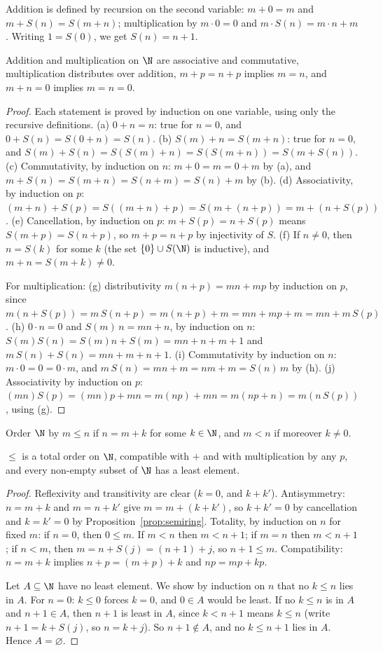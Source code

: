 Addition is defined by recursion on the second variable: $m+0=m$ and $m+S(n)=S(m+n)$; multiplication by $m\cdot0=0$ and
$m\cdot S(n)=m\cdot n+m$. Writing $1=S(0)$, we get $S(n)=n+1$.

\begin{proposition}\label{prop:semiring}
Addition and multiplication on $\N$ are associative and commutative, multiplication distributes over addition,
$m+p=n+p$ implies $m=n$, and $m+n=0$ implies $m=n=0$.
\end{proposition}
\begin{proof}
Each statement is proved by induction on one variable, using only the recursive definitions.
(a) $0+n=n$: true for $n=0$, and $0+S(n)=S(0+n)=S(n)$. (b) $S(m)+n=S(m+n)$: true for $n=0$, and
$S(m)+S(n)=S(S(m)+n)=S(S(m+n))=S(m+S(n))$. (c) Commutativity, by induction on $n$: $m+0=m=0+m$ by (a), and
$m+S(n)=S(m+n)=S(n+m)=S(n)+m$ by (b). (d) Associativity, by induction on $p$: $(m+n)+S(p)=S((m+n)+p)=S(m+(n+p))=m+(n+S(p))$.
(e) Cancellation, by induction on $p$: $m+S(p)=n+S(p)$ means $S(m+p)=S(n+p)$, so $m+p=n+p$ by injectivity of $S$.
(f) If $n\ne0$, then $n=S(k)$ for some $k$ (the set $\{0\}\cup S(\N)$ is inductive), and $m+n=S(m+k)\ne0$.

For multiplication: (g) distributivity $m(n+p)=mn+mp$ by induction on $p$, since $m(n+S(p))=m\,S(n+p)=m(n+p)+m=mn+mp+m=mn+m\,S(p)$.
(h) $0\cdot n=0$ and $S(m)\,n=mn+n$, by induction on $n$: $S(m)S(n)=S(m)n+S(m)=mn+n+m+1$ and $m\,S(n)+S(n)=mn+m+n+1$.
(i) Commutativity by induction on $n$: $m\cdot0=0=0\cdot m$, and $m\,S(n)=mn+m=nm+m=S(n)\,m$ by (h). (j) Associativity by
induction on $p$: $(mn)S(p)=(mn)p+mn=m(np)+mn=m(np+n)=m(n\,S(p))$, using (g).
\end{proof}

Order $\N$ by $m\le n$ if $n=m+k$ for some $k\in\N$, and $m<n$ if moreover $k\ne0$.

\begin{proposition}\label{prop:wellorder}
$\le$ is a total order on $\N$, compatible with $+$ and with multiplication by any $p$, and every non-empty subset of $\N$
has a least element.
\end{proposition}
\begin{proof}
Reflexivity and transitivity are clear ($k=0$, and $k+k'$). Antisymmetry: $n=m+k$ and $m=n+k'$ give $m=m+(k+k')$, so $k+k'=0$
by cancellation and $k=k'=0$ by Proposition~\ref{prop:semiring}. Totality, by induction on $n$ for fixed $m$: if $n=0$, then $0\le m$.
If $m<n$ then $m<n+1$; if $m=n$ then $m<n+1$; if $n<m$, then $m=n+S(j)=(n+1)+j$, so $n+1\le m$. Compatibility: $n=m+k$
implies $n+p=(m+p)+k$ and $np=mp+kp$.

Let $A\subseteq\N$ have no least element. We show by induction on $n$ that no $k\le n$ lies in $A$. For $n=0$: $k\le0$ forces $k=0$,
and $0\in A$ would be least. If no $k\le n$ is in $A$ and $n+1\in A$, then $n+1$ is least in $A$, since $k<n+1$ means $k\le n$
(write $n+1=k+S(j)$, so $n=k+j$). So $n+1\notin A$, and no $k\le n+1$ lies in $A$. Hence $A=\varnothing$.
\end{proof}

